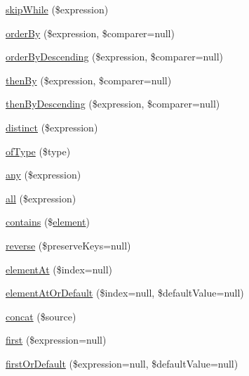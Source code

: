 \begin{DoxyCompactItemize}
\hyperlink{class_p_h_p_linq___linq_to_objects_a24ee105087c3674aeebbe5ded87dd389}{skip\-While} (\$expression)
\item 
\hyperlink{class_p_h_p_linq___linq_to_objects_a4da1bd83e986083bb8d34a401e8ebe2c}{order\-By} (\$expression, \$comparer=null)
\item 
\hyperlink{class_p_h_p_linq___linq_to_objects_a76ee5b40b6c67d792788c1dc1da2f1cf}{order\-By\-Descending} (\$expression, \$comparer=null)
\item 
\hyperlink{class_p_h_p_linq___linq_to_objects_a05857c194334417f951036f26570c348}{then\-By} (\$expression, \$comparer=null)
\item 
\hyperlink{class_p_h_p_linq___linq_to_objects_ad98ee4890a9297e3bb1689e340a51597}{then\-By\-Descending} (\$expression, \$comparer=null)
\item 
\hyperlink{class_p_h_p_linq___linq_to_objects_ad88bb13ea1b971fd2a973334caa4668f}{distinct} (\$expression)
\item 
\hyperlink{class_p_h_p_linq___linq_to_objects_a0a2ba7c0fc2611ebdb7af7827adac344}{of\-Type} (\$type)
\item 
\hyperlink{class_p_h_p_linq___linq_to_objects_a658a448c5998940e8d7f21a351403439}{any} (\$expression)
\item 
\hyperlink{class_p_h_p_linq___linq_to_objects_a74f8883392f4b48edb0fcd7aa05f3944}{all} (\$expression)
\item 
\hyperlink{class_p_h_p_linq___linq_to_objects_a13c5d8a1f5c3552eea74839799acebab}{contains} (\$\hyperlink{bug-904820_8php_aa94081298ab2dfd0f261cce6c203d9aa}{element})
\item 
\hyperlink{class_p_h_p_linq___linq_to_objects_a8c53c55a81fa2256fd89655f945059aa}{reverse} (\$preserve\-Keys=null)
\item 
\hyperlink{class_p_h_p_linq___linq_to_objects_aed8dd8dd04c924a6e7c9626f29f537df}{element\-At} (\$index=null)
\item 
\hyperlink{class_p_h_p_linq___linq_to_objects_ada7377d6eff2a6ad171c0616ec6271b8}{element\-At\-Or\-Default} (\$index=null, \$default\-Value=null)
\item 
\hyperlink{class_p_h_p_linq___linq_to_objects_a3e57723b96efe016e8a95ff23bfbc82e}{concat} (\$source)
\item 
\hyperlink{class_p_h_p_linq___linq_to_objects_a9c368dc77913f7cf4268bcaab18f848b}{first} (\$expression=null)
\item 
\hyperlink{class_p_h_p_linq___linq_to_objects_a970d3424f925820d6d9f0b4e2b1aa52c}{first\-Or\-Default} (\$expression=null, \$default\-Value=null)

\end{DoxyCompactItemize}
